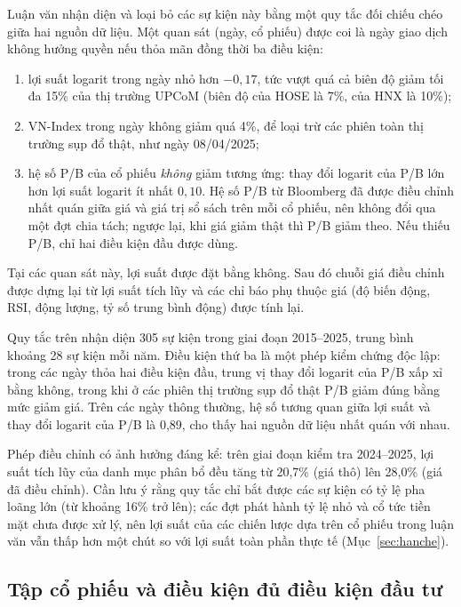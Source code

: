 Luận văn nhận diện và loại bỏ các sự kiện này bằng một quy tắc đối chiếu chéo giữa hai nguồn dữ liệu. Một quan sát (ngày, cổ phiếu) được coi là ngày giao dịch không hưởng quyền nếu thỏa mãn đồng thời ba điều kiện:
\begin{enumerate}[leftmargin=1.6cm]
  \item lợi suất logarit trong ngày nhỏ hơn $-0{,}17$, tức vượt quá cả biên độ giảm tối đa 15\% của thị trường UPCoM (biên độ của HOSE là 7\%, của HNX là 10\%);
  \item VN-Index trong ngày không giảm quá 4\%, để loại trừ các phiên toàn thị trường sụp đổ thật, như ngày 08/04/2025;
  \item hệ số P/B của cổ phiếu \emph{không} giảm tương ứng: thay đổi logarit của P/B lớn hơn lợi suất logarit ít nhất $0{,}10$. Hệ số P/B từ Bloomberg đã được điều chỉnh nhất quán giữa giá và giá trị sổ sách trên mỗi cổ phiếu, nên không đổi qua một đợt chia tách; ngược lại, khi giá giảm thật thì P/B giảm theo. Nếu thiếu P/B, chỉ hai điều kiện đầu được dùng.
\end{enumerate}
Tại các quan sát này, lợi suất được đặt bằng không. Sau đó chuỗi giá điều chỉnh được dựng lại từ lợi suất tích lũy và các chỉ báo phụ thuộc giá (độ biến động, RSI, động lượng, tỷ số trung bình động) được tính lại.

Quy tắc trên nhận diện 305 sự kiện trong giai đoạn 2015--2025, trung bình khoảng 28 sự kiện mỗi năm. Điều kiện thứ ba là một phép kiểm chứng độc lập: trong các ngày thỏa hai điều kiện đầu, trung vị thay đổi logarit của P/B xấp xỉ bằng không, trong khi ở các phiên thị trường sụp đổ thật P/B giảm đúng bằng mức giảm giá. Trên các ngày thông thường, hệ số tương quan giữa lợi suất và thay đổi logarit của P/B là 0,89, cho thấy hai nguồn dữ liệu nhất quán với nhau.

Phép điều chỉnh có ảnh hưởng đáng kể: trên giai đoạn kiểm tra 2024--2025, lợi suất tích lũy của danh mục phân bổ đều tăng từ 20,7\% (giá thô) lên 28,0\% (giá đã điều chỉnh). Cần lưu ý rằng quy tắc chỉ bắt được các sự kiện có tỷ lệ pha loãng lớn (từ khoảng 16\% trở lên); các đợt phát hành tỷ lệ nhỏ và cổ tức tiền mặt chưa được xử lý, nên lợi suất của các chiến lược dựa trên cổ phiếu trong luận văn vẫn thấp hơn một chút so với lợi suất toàn phần thực tế (Mục~\ref{sec:hanche}).

\subsection{Tập cổ phiếu và điều kiện đủ điều kiện đầu tư}
\label{sec:universe}

